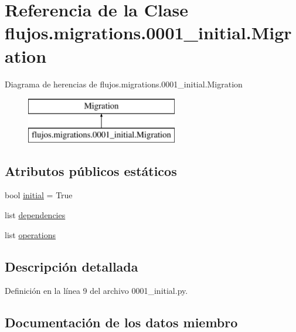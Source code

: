 \hypertarget{classflujos_1_1migrations_1_10001__initial_1_1_migration}{}\section{Referencia de la Clase flujos.\+migrations.0001\+\_\+initial.Migration}
\label{classflujos_1_1migrations_1_10001__initial_1_1_migration}
Diagrama de herencias de flujos.\+migrations.0001\+\_\+initial.Migration\begin{figure}[H]
\begin{center}
\leavevmode
\includegraphics[height=2.000000cm]{classflujos_1_1migrations_1_10001__initial_1_1_migration}
\end{center}
\end{figure}
\subsection*{Atributos públicos estáticos}
\begin{DoxyCompactItemize}
\item 
bool \hyperlink{classflujos_1_1migrations_1_10001__initial_1_1_migration_acac33de22b59ff2f084554f135ec7237}{initial} = True
\item 
list \hyperlink{classflujos_1_1migrations_1_10001__initial_1_1_migration_ab8abf92bf1fd8e340abf54a0b9b53a4a}{dependencies}
\item 
list \hyperlink{classflujos_1_1migrations_1_10001__initial_1_1_migration_a551e85de7746f53ce793e05a1925a165}{operations}
\end{DoxyCompactItemize}


\subsection{Descripción detallada}


Definición en la línea 9 del archivo 0001\+\_\+initial.\+py.



\subsection{Documentación de los datos miembro}
